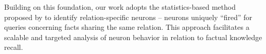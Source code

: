 Building on this foundation, our work adopts the statistics-based method proposed by \citet{neuron2022Cuadros} to identify relation-specific neurons -- neurons uniquely ``fired'' for queries concerning facts sharing the same relation. This approach facilitates a scalable and targeted analysis of neuron behavior in relation to factual knowledge recall.





